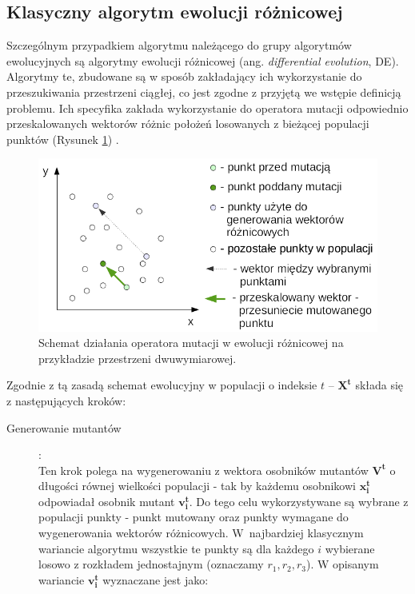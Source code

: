 \documentclass[12pt,a4paper]{report}
\begin{document}
{{%
\subsection{Klasyczny algorytm ewolucji różnicowej}
\label{DEvol_section}
\par{
Szczególnym przypadkiem algorytmu należącego do grupy algorytmów ewolucyjnych są algorytmy ewolucji różnicowej (ang.\emph{ differential evolution}, DE). Algorytmy te, zbudowane są w sposób zakładający ich wykorzystanie do przeszukiwania przestrzeni ciągłej, co jest zgodne z przyjętą we wstępie definicją problemu. Ich specyfika zakłada wykorzystanie do operatora mutacji odpowiednio przeskalowanych wektorów różnic położeń losowanych z bieżącej populacji punktów (Rysunek \ref{DEvolMutationBasic}) \cite{SpringerIntroToEvol}.
}

\begin{figure}[h]
\begin{center}\includegraphics[scale=0.8]{img/BasicMutationSchema.png}\end{center}
\caption{Schemat działania operatora mutacji w ewolucji różnicowej na przykładzie przestrzeni dwuwymiarowej.}
\label{DEvolMutationBasic}
\end{figure}


\par{
Zgodnie z tą zasadą schemat ewolucyjny w populacji o indeksie ${t}$ -- $\mathbf{X^t}$ składa się z następujących kroków:
}

\par{
	\begin{description}
	
	
  		\item[Generowanie mutantów]:\\
  Ten krok polega na wygenerowaniu z wektora osobników mutantów $\mathbf{V^{t}}$ o długości równej wielkości populacji - tak by każdemu osobnikowi $\mathbf{x_i^{t}}$ odpowiadał osobnik mutant $\mathbf{v_i^{t}}$.
  Do tego celu wykorzystywane są wybrane z populacji punkty - punkt mutowany oraz punkty wymagane do wygenerowania wektorów różnicowych. W~najbardziej klasycznym wariancie algorytmu wszystkie te punkty są dla każdego $i$ wybierane losowo z rozkładem jednostajnym \cite{SpringerIntroToEvol} (oznaczamy $r_1, r_2, r_3$).
  W opisanym wariancie $\mathbf{v_i^{t}}$ wyznaczane jest jako:


\end{description}}}}
\end{document}

